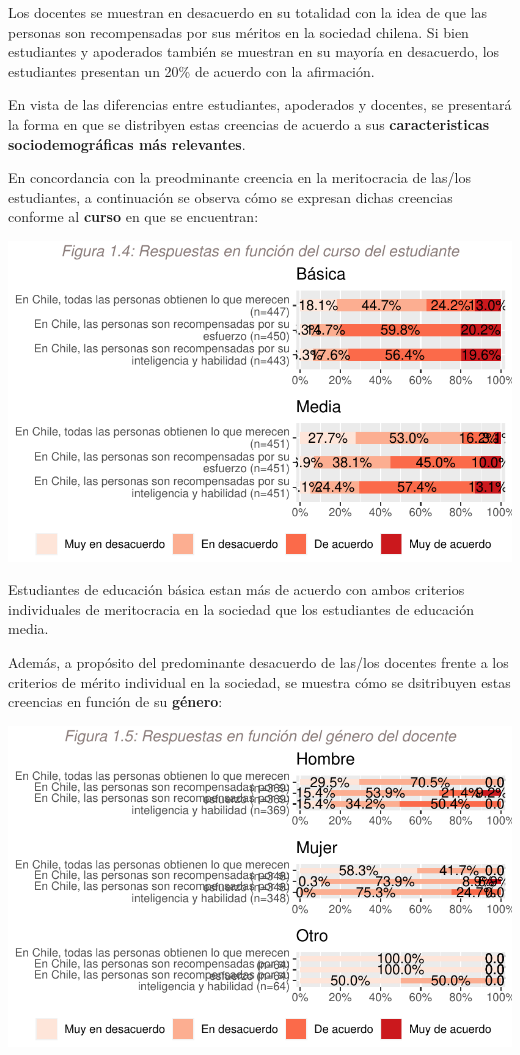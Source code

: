 \documentclass[
  letterpaper,
  DIV=11,
  numbers=noendperiod]{scrartcl}
\begin{document}
Los docentes se muestran en desacuerdo en su totalidad con la idea de
que las personas son recompensadas por sus méritos en la sociedad
chilena. Si bien estudiantes y apoderados también se muestran en su
mayoría en desacuerdo, los estudiantes presentan un 20\% de acuerdo con
la afirmación.

En vista de las diferencias entre estudiantes, apoderados y docentes, se
presentará la forma en que se distribyen estas creencias de acuerdo a
sus \textbf{caracteristicas sociodemográficas más relevantes}.

En concordancia con la preodminante creencia en la meritocracia de
las/los estudiantes, a continuación se observa cómo se expresan dichas
creencias conforme al \textbf{curso} en que se encuentran:

\includegraphics{doc-colegios-con-profes-y-apoderados_files/figure-pdf/unnamed-chunk-11-1.pdf}

Estudiantes de educación básica estan más de acuerdo con ambos criterios
individuales de meritocracia en la sociedad que los estudiantes de
educación media.

Además, a propósito del predominante desacuerdo de las/los docentes
frente a los criterios de mérito individual en la sociedad, se muestra
cómo se dsitribuyen estas creencias en función de su \textbf{género}:

\includegraphics{doc-colegios-con-profes-y-apoderados_files/figure-pdf/unnamed-chunk-13-1.pdf}
\end{document}
